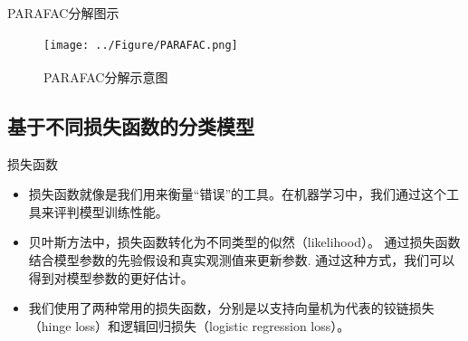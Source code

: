 \documentclass{beamer}
\newcommand{\supcite}[1]{\textsuperscript{\cite{#1}}}
\begin{document}
	\begin{frame}{PARAFAC分解图示}
		\begin{figure}
			\texttt{[image: ../Figure/PARAFAC.png]}
			\caption{PARAFAC分解示意图\supcite{a}}
		\end{figure}
	\end{frame}
	\subsection{基于不同损失函数的分类模型}
	\begin{frame}{损失函数}
		\begin{itemize}[<+->]
			\item 损失函数就像是我们用来衡量“错误”的工具。在机器学习中，我们通过这个工具来评判模型训练性能。
			\item 贝叶斯方法中，损失函数转化为不同类型的似然（likelihood）。 通过损失函数结合模型参数的先验假设和真实观测值来更新参数. 通过这种方式，我们可以得到对模型参数的更好估计。
			\item 我们使用了两种常用的损失函数，分别是以支持向量机为代表的铰链损失（hinge loss）和逻辑回归损失（logistic regression loss）。
		\end{itemize}
	\end{frame}
	
\end{document}
